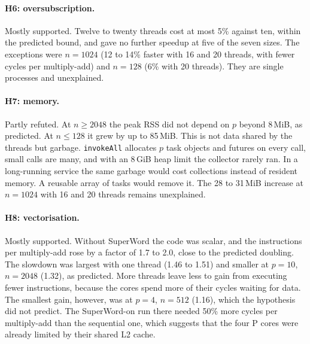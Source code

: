 \documentclass[11pt,a4paper]{article}
\begin{document}
\paragraph{H6: oversubscription.} Mostly supported. Twelve to twenty threads
cost at most 5\% against ten, within the predicted bound, and gave no further
speedup at five of the seven sizes. The exceptions were $n=1024$ (12 to 14\%
faster with 16 and 20 threads, with fewer cycles per multiply-add) and
$n=128$ (6\% with 20 threads). They are single processes and unexplained.

\paragraph{H7: memory.} Partly refuted. At $n\ge2048$ the peak RSS did not
depend on $p$ beyond 8\,MiB, as predicted. At $n\le128$ it grew by up to
85\,MiB. This is not data shared by the threads but garbage. \texttt{invokeAll}
allocates $p$ task objects and futures on every call, small calls are many, and
with an 8\,GiB heap limit the collector rarely ran. In a long-running service
the same garbage would cost collections instead of resident memory. A reusable
array of tasks would remove it. The 28 to 31\,MiB increase at $n=1024$ with 16
and 20 threads remains unexplained.

\paragraph{H8: vectorisation.} Mostly supported. Without SuperWord the code was
scalar, and the instructions per multiply-add rose by a factor of 1.7 to 2.0,
close to the predicted doubling. The slowdown was largest with one thread (1.46
to 1.51) and smaller at $p=10$, $n=2048$ (1.32), as predicted. More threads
leave less to gain from executing fewer instructions, because the cores spend
more of their cycles waiting for data. The smallest gain, however, was at $p=4$,
$n=512$ (1.16), which the hypothesis did not predict. The SuperWord-on run there
needed 50\% more cycles per multiply-add than the sequential one, which
suggests that the four P cores were already limited by their shared L2 cache.
\end{document}
